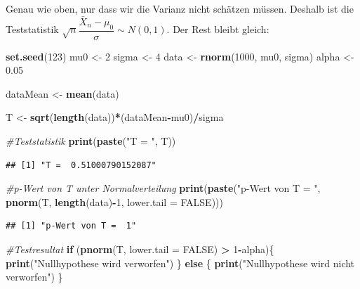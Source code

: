 \documentclass[]{article}
\newenvironment{Shaded}{\begin{snugshade}}{\end{snugshade}}
\newcommand{\CommentTok}[1]{\textcolor[rgb]{0.56,0.35,0.01}{\textit{#1}}}
\newcommand{\ControlFlowTok}[1]{\textcolor[rgb]{0.13,0.29,0.53}{\textbf{#1}}}
\newcommand{\DataTypeTok}[1]{\textcolor[rgb]{0.13,0.29,0.53}{#1}}
\newcommand{\DecValTok}[1]{\textcolor[rgb]{0.00,0.00,0.81}{#1}}
\newcommand{\FloatTok}[1]{\textcolor[rgb]{0.00,0.00,0.81}{#1}}
\newcommand{\KeywordTok}[1]{\textcolor[rgb]{0.13,0.29,0.53}{\textbf{#1}}}
\newcommand{\NormalTok}[1]{#1}
\newcommand{\OperatorTok}[1]{\textcolor[rgb]{0.81,0.36,0.00}{\textbf{#1}}}
\newcommand{\OtherTok}[1]{\textcolor[rgb]{0.56,0.35,0.01}{#1}}
\newcommand{\StringTok}[1]{\textcolor[rgb]{0.31,0.60,0.02}{#1}}
\begin{document}
Genau wie oben, nur dass wir die Varianz nicht schätzen müssen.
Deshalb ist die Teststatistik \(\sqrt{n}\dfrac{\bar X_n-\mu_0}{\sigma}\sim N(0,1)\).
Der Rest bleibt gleich:

\begin{Shaded}
\begin{Highlighting}[]
\KeywordTok{set.seed}\NormalTok{(}\DecValTok{123}\NormalTok{)}
\NormalTok{mu0 <-}\StringTok{ }\DecValTok{2}
\NormalTok{sigma <-}\StringTok{ }\DecValTok{4}
\NormalTok{data <-}\StringTok{ }\KeywordTok{rnorm}\NormalTok{(}\DecValTok{1000}\NormalTok{, mu0, sigma)}
\NormalTok{alpha <-}\StringTok{ }\FloatTok{0.05}

\NormalTok{dataMean <-}\StringTok{ }\KeywordTok{mean}\NormalTok{(data)}

\NormalTok{T <-}\StringTok{ }\KeywordTok{sqrt}\NormalTok{(}\KeywordTok{length}\NormalTok{(data))}\OperatorTok{*}\NormalTok{(dataMean}\OperatorTok{-}\NormalTok{mu0)}\OperatorTok{/}\NormalTok{sigma}

\CommentTok{#Teststatistik}
\KeywordTok{print}\NormalTok{(}\KeywordTok{paste}\NormalTok{(}\StringTok{"T = "}\NormalTok{, T))}
\end{Highlighting}
\end{Shaded}

\begin{verbatim}
## [1] "T =  0.51000790152087"
\end{verbatim}

\begin{Shaded}
\begin{Highlighting}[]
\CommentTok{#p-Wert von T unter Normalverteilung}
\KeywordTok{print}\NormalTok{(}\KeywordTok{paste}\NormalTok{(}\StringTok{"p-Wert von T = "}\NormalTok{, }\KeywordTok{pnorm}\NormalTok{(T, }\KeywordTok{length}\NormalTok{(data)}\OperatorTok{-}\DecValTok{1}\NormalTok{, }\DataTypeTok{lower.tail =} \OtherTok{FALSE}\NormalTok{)))}
\end{Highlighting}
\end{Shaded}

\begin{verbatim}
## [1] "p-Wert von T =  1"
\end{verbatim}

\begin{Shaded}
\begin{Highlighting}[]
\CommentTok{#Testresultat}
\ControlFlowTok{if}\NormalTok{ (}\KeywordTok{pnorm}\NormalTok{(T, }\DataTypeTok{lower.tail =} \OtherTok{FALSE}\NormalTok{) }\OperatorTok{>}\StringTok{ }\DecValTok{1}\OperatorTok{-}\NormalTok{alpha)\{}
  \KeywordTok{print}\NormalTok{(}\StringTok{"Nullhypothese wird verworfen"}\NormalTok{)}
\NormalTok{\} }\ControlFlowTok{else}\NormalTok{ \{}
  \KeywordTok{print}\NormalTok{(}\StringTok{"Nullhypothese wird nicht verworfen"}\NormalTok{)}
\NormalTok{\}}
\end{Highlighting}
\end{Shaded}
\end{document}
